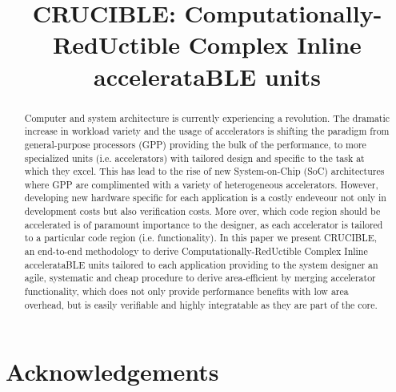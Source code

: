 \documentclass[pageno]{jpaper}
\begin{document}
\title{CRUCIBLE: Computationally-RedUctible Complex Inline accelerataBLE units}

\maketitle

\thispagestyle{empty}

\begin{abstract}

Computer and system architecture is currently experiencing a revolution. The dramatic
increase in workload variety and the usage of accelerators is shifting the paradigm from general-purpose
processors (GPP) providing the bulk of the performance, to more specialized units (i.e. accelerators) with tailored
design and specific to the task at which they excel. This has lead to the rise of new System-on-Chip (SoC) architectures
where GPP are complimented with a variety of heterogeneous accelerators. However, developing new hardware specific
for each application is a costly endeveour not only in development costs but also verification costs. More over, which
code region should be accelerated is of paramount importance to the designer, as each accelerator is tailored to a particular code region (i.e. functionality).
In this paper we present CRUCIBLE, an end-to-end methodology to derive Computationally-RedUctible Complex Inline accelerataBLE units
tailored to each application providing to the system designer an agile, systematic and cheap procedure to derive area-efficient by merging 
accelerator functionality, which does not only provide performance benefits with low area overhead, but is easily verifiable and highly integratable as they 
are part of the core.

\end{abstract}





\section{Acknowledgements}



\end{document}
